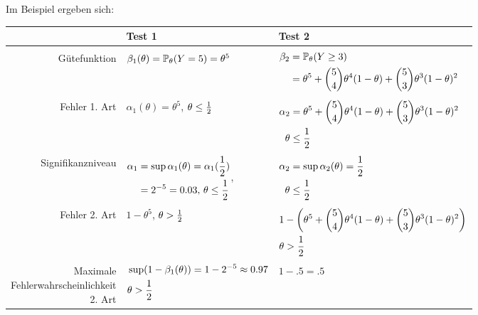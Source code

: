 Im Beispiel ergeben sich:
\begin{footnotesize}
  \begin{center}
    \begin{tabular}{r|l|l}
      & Test 1
      & Test 2 \\
      \hline & \\
      Gütefunktion
      & $\beta_1(\theta) = \mathbb{P}_\theta(Y = 5) = \theta^5$
      & $\begin{aligned}
        \beta_2 &= \mathbb{P}_\theta(Y \ge 3) \\
        &= \theta^5 + \binom{5}{4} \theta^4 (1 - \theta)
        + \binom{5}{3} \theta^3 (1-\theta)^2 \end{aligned}$ \\
      \hline & \\
      Fehler 1. Art
      & $\alpha_1(\theta) = \theta^5$, $\theta \le \frac{1}{2}$
      & $\begin{aligned}
        \alpha_2 &= \theta^5 + \binom{5}{4} \theta^4 (1 - \theta)
        + \binom{5}{3} \theta^3 (1-\theta)^2 \\
        \theta &\le \frac{1}{2}
      \end{aligned}$ \\
      \hline & \\
      Signifikanzniveau
      & $\begin{aligned}
        \alpha_1 &= \sup \alpha_1(\theta) = \alpha_1(\frac{1}{2}) \\
        &= 2^{-5} = \num{.03}, \, \theta \le \frac{1}{2}
      \end{aligned}$,
      & $\begin{aligned}
        \alpha_2 &= \sup \alpha_2(\theta) = \frac{1}{2} \\
        \theta &\le \frac{1}{2}
      \end{aligned}$ \\
      \hline & \\
      Fehler 2. Art
      & $1 - \theta^5$, $\theta > \frac{1}{2}$
      & $\begin{aligned}
        &1 - \left( \theta^5 + \binom{5}{4} \theta^4 (1-\theta)
          + \binom{5}{3} \theta^3 (1-\theta)^2 \right) \\
        &\theta > \frac{1}{2}
      \end{aligned}$ \\
      \hline & \\
      \shortstack[r]{Maximale \\ Fehlerwahrscheinlichkeit \\ 2. Art}
      & $\begin{aligned}
        &\sup (1-\beta_1(\theta)) = 1 - 2^{-5} \approx \num{.97} \\
        &\theta > \frac{1}{2}
      \end{aligned}$
      & $1 - \num{.5} = \num{.5}$
    \end{tabular}
  \end{center}
\end{footnotesize}

